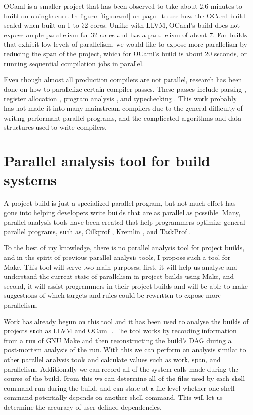\documentclass[10pt]{article}
\begin{document}
OCaml is a smaller project that has been observed to take about 2.6 minutes to build on a single core.
In figure~\ref{fig:ocaml} on page~\pageref{fig:ocaml} to see how the OCaml build scaled when built
on 1 to 32 cores.  Unlike with LLVM, OCaml's build does not expose ample parallelism for 32 cores and
has a parallelism of about 7.  For builds that exhibit low levels of parallelism, we would like to
expose more parallelism by reducing the span of the project, which for OCaml's build is about 20 seconds,
or running sequential compilation jobs in parallel.


Even though almost all production compilers are not parallel, research
has been done on how to parallelize certain compiler passes.  These passes include
parsing \cite{barenghi2015parallel}, register allocation \cite{makowski1995achieving} \cite{zobel1993program}, program analysis \cite{kuper2014freeze}
\cite{mendez2010parallel} \cite{prabhu2011eigencfa} \cite{zobel1992program}, and typechecking \cite{newton2016parallel}.
This work probably has not made it into many mainstream compilers due to the general difficulty of writing
performant parallel programs, and the complicated algorithms and data structures used to write compilers.

\section{Parallel analysis tool for build systems}
\label{sec:build}

A project build is just a specialized parallel program, but not much effort has gone
into helping developers write builds that are as parallel as possible.  Many, parallel
analysis tools have been created that help programmers optimize general parallel programs,
such as, Cilkprof \cite{schardl2015cilkprof}, Kremlin \cite{garcia2011kremlin}, and TaskProf
\cite{yoga2017fast}.

To the best of my knowledge, there is no parallel analysis tool for project builds, and in the
spirit of previous parallel analysis tools, I propose such a tool for Make.  This tool will
serve two main purposes; first, it will help us analyse and understand the current state of
parallelism in project builds using Make, and second, it will assist programmers in their project
builds and will be able to make suggestions of which targets and rules could be rewritten to
expose more parallelism.

Work has already begun on this tool and it has been used to analyse the builds of
projects such as LLVM \cite{lattner2002llvm} and OCaml \cite{ocaml}.  The tool works by
recording information from a run of GNU Make and then reconstructing the build's DAG
during a post-mortem analysis of the run.  With this we can perform an analysis similar
to other parallel analysis tools and calculate values such as work, span, and
parallelism.
Additionally we can record all of the system calls made during the course of the build.
From this we can determine all of the files used by each shell command run during the build, and
can state at a file-level whether one shell-command potentially depends on another shell-command.
This will let us determine the accuracy of user defined dependencies.
\end{document}
